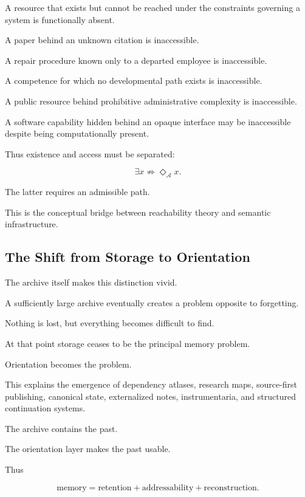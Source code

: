 \documentclass[11pt]{article}
\theoremstyle{remark}
\newcommand{\Adm}{\mathcal{A}}
\begin{document}
A resource that exists but cannot be reached under the constraints governing a
system is functionally absent.

A paper behind an unknown citation is inaccessible.

A repair procedure known only to a departed employee is inaccessible.

A competence for which no developmental path exists is inaccessible.

A public resource behind prohibitive administrative complexity is inaccessible.

A software capability hidden behind an opaque interface may be inaccessible
despite being computationally present.

Thus existence and access must be separated:

\begin{equation}
\exists x
\not\Rightarrow
\Diamond_{\Adm}x.
\end{equation}

The latter requires an admissible path.

This is the conceptual bridge between reachability theory and semantic
infrastructure.

\subsection{The Shift from Storage to Orientation}

The archive itself makes this distinction vivid.

A sufficiently large archive eventually creates a problem opposite to
forgetting.

Nothing is lost, but everything becomes difficult to find.

At that point storage ceases to be the principal memory problem.

Orientation becomes the problem.

This explains the emergence of dependency atlases, research maps, source-first
publishing, canonical state, externalized notes, instrumentaria, and structured
continuation systems.

The archive contains the past.

The orientation layer makes the past usable.

Thus

\begin{equation}
\text{memory}
=
\text{retention}
+
\text{addressability}
+
\text{reconstruction}.
\end{equation}
\end{document}
